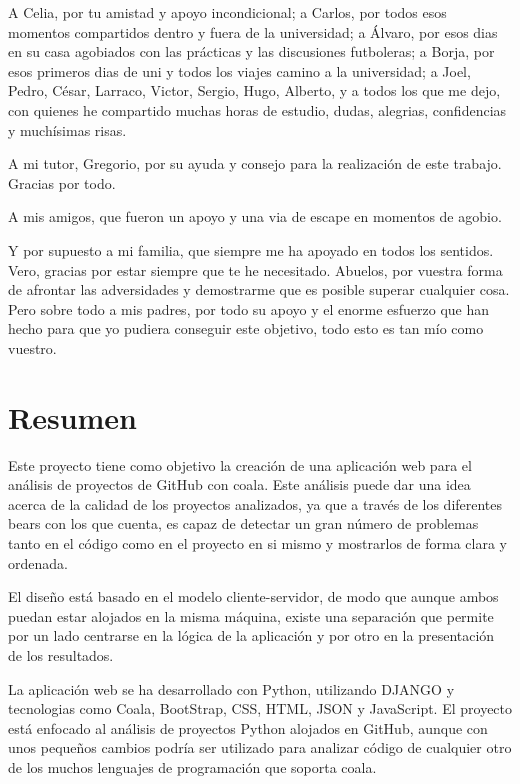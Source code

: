 \documentclass[a4paper, 12pt]{book}
\begin{document}
A Celia, por tu amistad y apoyo incondicional; a Carlos, por todos esos momentos compartidos dentro y fuera de la universidad; a Álvaro, por esos dias en su casa agobiados con las prácticas y las discusiones futboleras; a Borja, por esos primeros dias de uni y todos los viajes camino a la universidad; a Joel, Pedro, César, Larraco, Victor, Sergio, Hugo, Alberto, y a todos los que me dejo, con quienes he compartido muchas horas de estudio, dudas, alegrias, confidencias y muchísimas risas.

A mi tutor, Gregorio, por su ayuda y consejo para la realización de este trabajo. Gracias por todo.

A mis amigos, que fueron un apoyo y una via de escape en momentos de agobio.

Y por supuesto a mi familia, que siempre me ha apoyado en todos los sentidos. Vero, gracias por estar siempre que te he necesitado. Abuelos, por vuestra forma de afrontar las adversidades y demostrarme que es posible superar cualquier cosa. Pero sobre todo a mis padres, por todo su apoyo y el enorme esfuerzo que han hecho para que yo pudiera conseguir este objetivo, todo esto es tan mío como vuestro.


\chapter*{Resumen}

Este proyecto tiene como objetivo la creación de una aplicación web para el análisis de
proyectos de GitHub con coala. Este análisis puede dar una idea acerca de la calidad de
los proyectos analizados, ya que a través de los diferentes bears con los que cuenta, es
capaz de detectar un gran número de problemas tanto en el código como en el proyecto en si mismo
y mostrarlos de forma clara y ordenada.

El diseño está basado en el modelo cliente-servidor, de modo que aunque ambos puedan estar
alojados en la misma máquina, existe una separación que permite por un lado centrarse en la
lógica de la aplicación y por otro en la presentación de los resultados.

La aplicación web se ha desarrollado con Python, utilizando DJANGO y tecnologias como Coala, 
BootStrap, CSS, HTML, JSON y JavaScript. El proyecto está enfocado al análisis de proyectos 
Python alojados en GitHub, aunque con unos pequeños cambios podría ser utilizado para analizar 
código de cualquier otro de los muchos lenguajes de programación que soporta coala.
\end{document}

